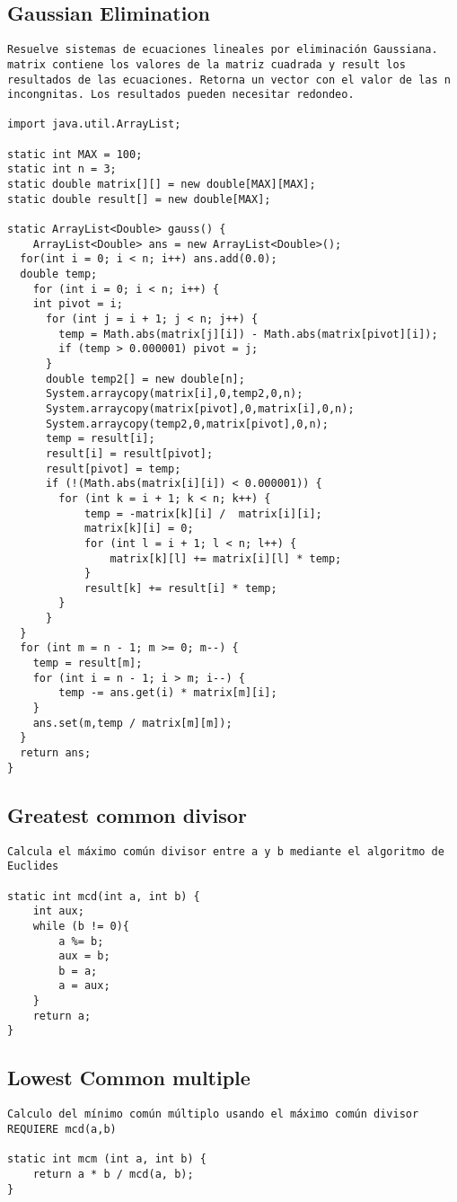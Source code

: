 \documentclass[10pt,letterpaper,twocolumn,twosided]{article}
\begin{document}
\subsection{Gaussian Elimination}
\begin{lstlisting}
Resuelve sistemas de ecuaciones lineales por eliminación Gaussiana. matrix contiene los valores de la matriz cuadrada y result los resultados de las ecuaciones. Retorna un vector con el valor de las n incongnitas. Los resultados pueden necesitar redondeo.

import java.util.ArrayList;

static int MAX = 100;
static int n = 3;
static double matrix[][] = new double[MAX][MAX];
static double result[] = new double[MAX];

static ArrayList<Double> gauss() {
	ArrayList<Double> ans = new ArrayList<Double>();
  for(int i = 0; i < n; i++) ans.add(0.0);
  double temp;
	for (int i = 0; i < n; i++) {
    int pivot = i;
	  for (int j = i + 1; j < n; j++) {
	  	temp = Math.abs(matrix[j][i]) - Math.abs(matrix[pivot][i]);
	    if (temp > 0.000001) pivot = j;
	  }
	  double temp2[] = new double[n];
	  System.arraycopy(matrix[i],0,temp2,0,n);
	  System.arraycopy(matrix[pivot],0,matrix[i],0,n);
	  System.arraycopy(temp2,0,matrix[pivot],0,n);
	  temp = result[i];
	  result[i] = result[pivot];
	  result[pivot] = temp;  
	  if (!(Math.abs(matrix[i][i]) < 0.000001)) {	
	    for (int k = i + 1; k < n; k++) {
		   	temp = -matrix[k][i] /  matrix[i][i];
		   	matrix[k][i] = 0;
		   	for (int l = i + 1; l < n; l++) {
		     	matrix[k][l] += matrix[i][l] * temp;
		    }
	  		result[k] += result[i] * temp;
	  	}
	  }
  }
  for (int m = n - 1; m >= 0; m--) {
   	temp = result[m];
   	for (int i = n - 1; i > m; i--) {
   		temp -= ans.get(i) * matrix[m][i];
   	}
   	ans.set(m,temp / matrix[m][m]);
  }
  return ans;
}\end{lstlisting}

\subsection{Greatest common divisor}
\begin{lstlisting}
Calcula el máximo común divisor entre a y b mediante el algoritmo de Euclides

static int mcd(int a, int b) {
	int aux;
	while (b != 0){
		a %= b;
		aux = b;
		b = a;
		a = aux;
	}
	return a;
}
\end{lstlisting}

\subsection{Lowest Common multiple}
\begin{lstlisting}
Calculo del mínimo común múltiplo usando el máximo común divisor REQUIERE mcd(a,b)

static int mcm (int a, int b) {
	return a * b / mcd(a, b);
}
\end{lstlisting}
\end{document}
